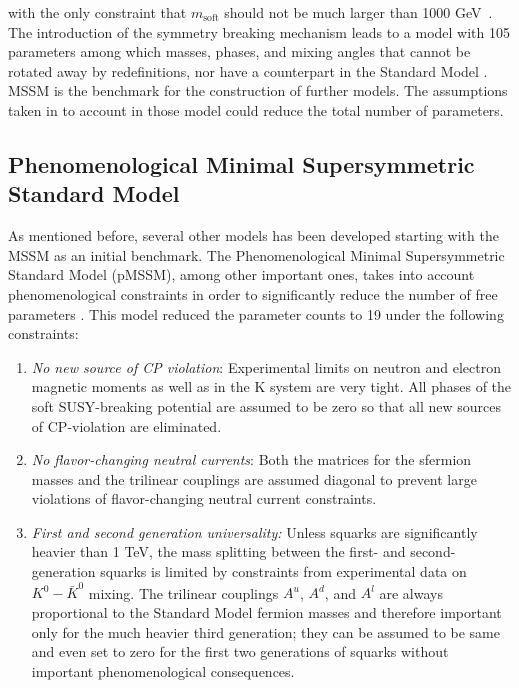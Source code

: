 with the only constraint that $m_{\mathrm{soft}}$ should not be much larger than 1000 GeV~\cite{Martin:1997ns}. The introduction of the symmetry breaking mechanism leads to a model with 105 parameters among which masses, phases, and mixing angles that cannot be rotated away by redefinitions, nor have a counterpart in the Standard Model \cite{Dimopoulos:1995ju}. MSSM is the benchmark for the construction of further models. The assumptions taken in to account in those model could reduce the total number of parameters.

\FloatBarrier

\subsection{Phenomenological Minimal Supersymmetric Standard Model }

\FloatBarrier

As mentioned before, several other models has been developed starting with the MSSM as an initial benchmark. The Phenomenological Minimal Supersymmetric Standard Model (pMSSM), among other important ones, takes into account phenomenological constraints in order to significantly reduce the number of free parameters \cite{Djouadi:1998di}. This model reduced the parameter counts to 19 under the following constraints:
\begin{enumerate}
	\item \emph{No new source of CP violation}: Experimental limits on neutron and electron magnetic moments as well as in the K system are very tight. All phases of the soft SUSY-breaking potential are assumed to be zero so that all new sources of CP-violation are eliminated.
	\item \emph{No flavor-changing neutral currents}: Both the matrices for the sfermion masses and the trilinear couplings are assumed diagonal to prevent large violations of flavor-changing neutral current constraints.
	\item \emph{First and second generation universality:} Unless squarks are significantly heavier than 1 TeV, the mass splitting between the first- and second-generation squarks is limited by constraints from experimental data on $K^0-\bar{K}^0$ mixing. The trilinear couplings $A^u$, $A^d$, and $A^l$ are always proportional to the Standard Model fermion masses and therefore important only for the much heavier third generation; they can be assumed to be same and even set to zero for the first two generations of squarks without important phenomenological consequences.
\end{enumerate}

